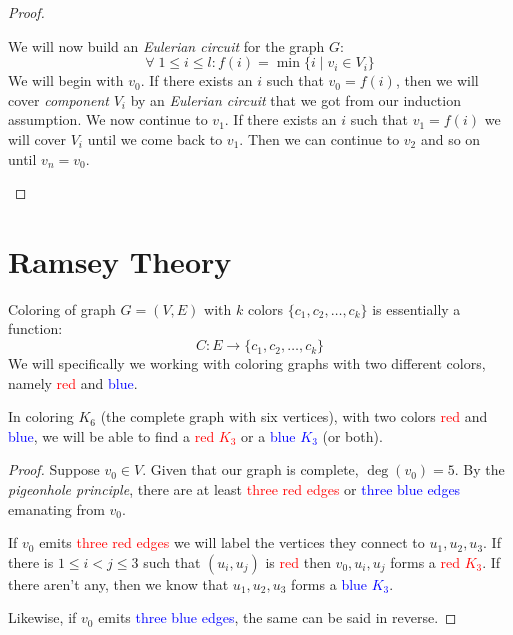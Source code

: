 \documentclass[00_complete]{subfiles}
\begin{document}
\begin{proof}
\begin{enumerate}
\begin{enumerate}[I.]
            We will now build an \emph{Eulerian circuit} for the graph $G$:
            $$\forall \; 1 \leq i \leq l: f(i)=\min\{i \mid v_i \in V_i\}$$
            We will begin with $v_0$. If there exists an $i$ such that $v_0=f(i)$,
            then we will cover \emph{component} $V_i$ by an \emph{Eulerian
            circuit} that we got from our induction assumption. We now continue
            to $v_1$. If there exists an $i$ such that $v_1=f(i)$ we will cover
            $V_i$ until we come back to $v_1$. Then we can continue to $v_2$
            and so on until $v_n=v_0$.
            \end{enumerate}
    \end{enumerate}
\end{proof}
\section{Ramsey Theory}

Coloring of graph $G=(V,E)$ with $k$ colors $\{c_1,c_2,\dots,c_k\}$ is
essentially a function:
$$C: E \to \{c_1,c_2,\dots,c_k\}$$
We will specifically we working with coloring graphs with two different colors,
namely \textcolor{red}{red} and \textcolor{blue}{blue}.

\begin{claim}
    In coloring $K_6$ (the complete graph with six vertices), with two colors
    \textcolor{red}{red} and \textcolor{blue}{blue}, we will be able to find a
    \textcolor{red}{red $K_3$} or a \textcolor{blue}{blue $K_3$} (or both).
\end{claim}

\begin{proof}
    Suppose $v_0 \in V$. Given that our graph is complete, $\deg(v_0)=5$. By
    the \emph{pigeonhole principle}, there are at least \textcolor{red}{three red
    edges} or \textcolor{blue}{three blue edges} emanating from $v_0$.

    If $v_0$ emits \textcolor{red}{three red edges} we will label the vertices
    they connect to $u_1,u_2,u_3$. If there is $1 \leq i < j \leq 3$ such that
    $(u_i,u_j)$ is \textcolor{red}{red} then $v_0,u_i,u_j$ forms a
    \textcolor{red}{red $K_3$}. If there aren't any, then we know that
    $u_1,u_2,u_3$ forms a \textcolor{blue}{blue $K_3$}.

    Likewise, if $v_0$ emits \textcolor{blue}{three blue edges}, the same can
    be said in reverse.
\end{proof}
\end{document}
